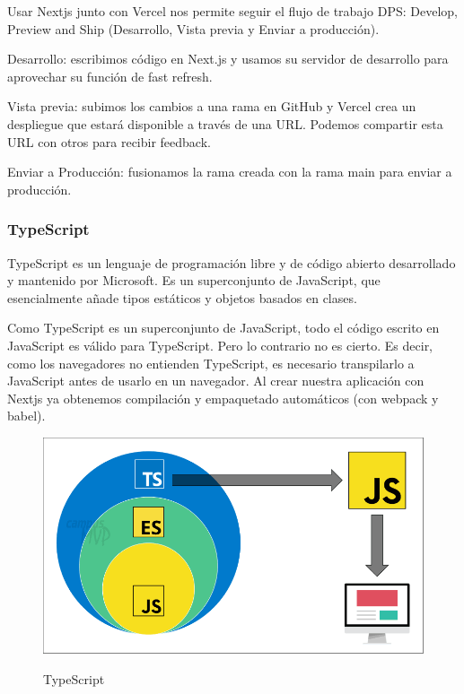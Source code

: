 \documentclass[12pt,twoside,titlepage]{report}
\begin{document}
Usar Nextjs junto con Vercel nos permite seguir el flujo de trabajo DPS: Develop, Preview and Ship (Desarrollo, Vista previa y Enviar a producción).

\begin{compactitem}
    \item Desarrollo: escribimos código en Next.js y usamos su servidor de desarrollo para aprovechar su función de fast refresh.
    \item Vista previa: subimos los cambios a una rama en GitHub y Vercel crea un despliegue que estará disponible a través de una URL. Podemos compartir esta URL con otros para recibir feedback.
    \item Enviar a Producción: fusionamos la rama creada con la rama main para enviar a producción.
\end{compactitem}

\subsubsection{TypeScript}

TypeScript es un lenguaje de programación libre y de código abierto desarrollado y mantenido por Microsoft. Es un superconjunto de JavaScript, que esencialmente añade tipos estáticos y objetos basados en clases.

Como TypeScript es un superconjunto de JavaScript, todo el código escrito en JavaScript es válido para TypeScript. Pero lo contrario no es cierto. Es decir, como los navegadores no entienden TypeScript, es necesario transpilarlo a JavaScript antes de usarlo en un navegador. Al crear nuestra aplicación con Nextjs ya obtenemos compilación y empaquetado automáticos (con webpack y babel).

\begin{figure}[H]
    \centering
    \includegraphics[scale=0.4]{TYPESCRIPT}
    \label{fig:TypeScript}
    \caption{TypeScript}
\end{figure}
\end{document}
